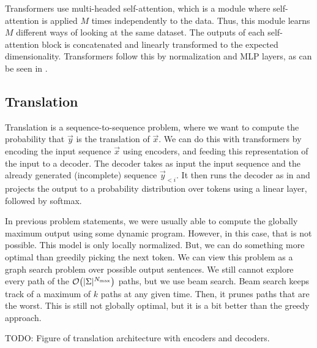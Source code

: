 Transformers \citep{vaswani2017attention} use multi-headed self-attention,
which is a module where self-attention is applied $M$ times independently to
the data. Thus, this module learns $M$ different ways of looking at the same
dataset. The outputs of each self-attention block is concatenated and linearly
transformed to the expected dimensionality. Transformers follow this by
normalization and MLP layers, as can be seen in .

\subsection{Translation}

Translation is a sequence-to-sequence problem, where we want to compute the
probability that $\vec{y}$ is the translation of $\vec{x}$. We can do this with
transformers by encoding the input sequence $\vec{x}$ using encoders, and
feeding this representation of the input to a decoder. The decoder takes as
input the input sequence and the already generated (incomplete) sequence
$\vec{y}_{<i}$. It then runs the decoder as in  and
projects the output to a probability distribution over tokens using a linear
layer, followed by softmax.

In previous problem statements, we were usually able to compute the globally
maximum output using some dynamic program. However, in this case, that is not
possible. This model is only locally normalized. But, we can do something more
optimal than greedily picking the next token. We can view this problem as a
graph search problem over possible output sentences. We still cannot explore
every path of the $\bigo{|\Sigma|^{N_{\max}}}$ paths, but we use beam search.
Beam search keeps track of a maximum of $k$ paths at any given time. Then, it
prunes paths that are the worst. This is still not globally optimal, but it is
a bit better than the greedy approach.

TODO: Figure of translation architecture with encoders and decoders.

